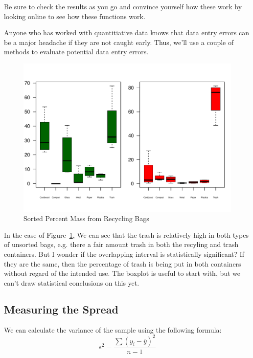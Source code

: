 \documentclass{tufte-handout}\usepackage[]{graphicx}\usepackage[]{color}
\makeatletter
\def\maxwidth{ %
  \ifdim\Gin@nat@width>\linewidth
    \linewidth
  \else
    \Gin@nat@width
  \fi
}
\newenvironment{knitrout}{}{} %
\makeatother
\begin{document}
Be sure to check the results as you go and convince yourself how these work by looking online to see how these functions work. 

Anyone who has worked with quantitiative data knows that data entry errors can be a major headache if they are not caught early. Thus, we'll use a couple of methods to evaluate potential data entry errors. 

\begin{figure}
\caption{Sorted Percent Mass from Recycling Bags}
\label{fig:percent_bp}
\begin{knitrout}
\color{fgcolor}
\includegraphics[width=\maxwidth]{figure/unnamed-chunk-9-1} 

\end{knitrout}
\end{figure}

In the case of Figure~\ref{fig:percent_bp}, We can see that the trash is relatively high in both types of unsorted bags, e.g. there a fair amount trash in both the recyling and trash containers. But I wonder if the overlapping interval is statistically significant?  If they are the same, then the percentage of trash is being put in both containers without regard of the intended use. The boxplot is useful to start with, but we can't draw statistical conclusions on this yet.  

\subsection{Measuring the Spread}

We can calculate the variance of the sample using the following formula: 
\begin{equation}
s^2 = \frac{\sum(y_i - \bar{y})^2}{n-1}
\end{equation}
\end{document}
